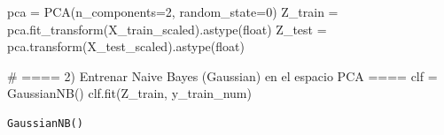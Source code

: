 \documentclass[
  letterpaper,
  DIV=11,
  numbers=noendperiod]{scrartcl}
\newenvironment{Shaded}{\begin{snugshade}}{\end{snugshade}}
\newcommand{\BuiltInTok}[1]{\textcolor[rgb]{0.00,0.23,0.31}{#1}}
\newcommand{\CommentTok}[1]{\textcolor[rgb]{0.37,0.37,0.37}{#1}}
\newcommand{\DecValTok}[1]{\textcolor[rgb]{0.68,0.00,0.00}{#1}}
\newcommand{\NormalTok}[1]{\textcolor[rgb]{0.00,0.23,0.31}{#1}}
\newcommand{\OperatorTok}[1]{\textcolor[rgb]{0.37,0.37,0.37}{#1}}
\begin{document}
\begin{Shaded}
\begin{Highlighting}[]
\NormalTok{pca }\OperatorTok{=}\NormalTok{ PCA(n\_components}\OperatorTok{=}\DecValTok{2}\NormalTok{, random\_state}\OperatorTok{=}\DecValTok{0}\NormalTok{)}
\NormalTok{Z\_train }\OperatorTok{=}\NormalTok{ pca.fit\_transform(X\_train\_scaled).astype(}\BuiltInTok{float}\NormalTok{)}
\NormalTok{Z\_test  }\OperatorTok{=}\NormalTok{ pca.transform(X\_test\_scaled).astype(}\BuiltInTok{float}\NormalTok{)}

\CommentTok{\# ==== 2) Entrenar Naive Bayes (Gaussian) en el espacio PCA ====}
\NormalTok{clf }\OperatorTok{=}\NormalTok{ GaussianNB()}
\NormalTok{clf.fit(Z\_train, y\_train\_num)}
\end{Highlighting}
\end{Shaded}

\begin{verbatim}
GaussianNB()
\end{verbatim}
\end{document}
